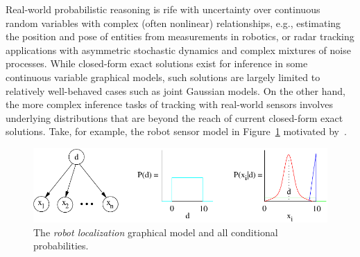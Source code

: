 \documentclass[letterpaper]{article}
\begin{document}



Real-world probabilistic reasoning is rife with 
uncertainty over continuous random variables with
complex (often nonlinear) relationships, e.g.,
estimating the position and pose of entities from 
measurements in robotics, or radar tracking
applications with asymmetric stochastic dynamics and complex mixtures of 
noise processes.
While closed-form exact solutions exist for inference in some
continuous variable graphical models, such solutions are largely
limited to relatively well-behaved cases such as joint Gaussian
models.  On the other hand, the more complex inference tasks of
tracking with real-world sensors involves underlying distributions
that are beyond the reach of current closed-form exact solutions.
Take, for example, the robot sensor model in Figure~\ref{fig:gm2} 
motivated by~\cite{thrun_mcl}.
\begin{figure}%
\begin{center}
\vspace{-1mm}
\includegraphics[width=.48\textwidth]{gm2.pdf}
\end{center}
\vspace{-6mm}
\caption{\footnotesize The \emph{robot localization} graphical model and all conditional probabilities.} \label{fig:gm2}
\vspace{-4mm}
\end{figure}
\end{document}
